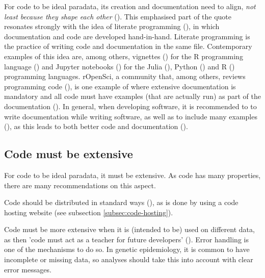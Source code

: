 For code to be ideal paradata, 
its creation and documentation need to align, 
\emph{not least because they shape each other} (\cite{huvila2022improving}).
This emphasised part of the quote resonates strongly with the idea of 
literate programming (\cite{knuth1984literate}),
in which documentation and code are developed hand-in-hand.
Literate programming is the practice of writing code and 
documentation in the same file.
Contemporary examples of this idea are, among others, 
vignettes (\cite{wickham2015r}) for the R programming language (\cite{r}) 
and Jupyter notebooks (\cite{wang2020assessing})
for the Julia (\cite{Julia-2017}), Python (\cite{van1995python}) and R (\cite{r})
programming languages.
rOpenSci, a community that, among others, reviews programming
code (\cite{ram2013ropensci,ram2018community}), is 
one example of where extensive documentation is mandatory
and all code must have examples (that are actually run)
as part of the documentation (\cite{ropensci_2021_6619350}).
In general, when developing software, 
it is recommended to 
to write documentation while writing software,
as well as to include many examples (\cite{lee2018ten}),
as this leads to both better code and documentation (\cite{reenskaug1989environment}).

\subsection{Code must be extensive}

For code to be ideal paradata, it must be extensive.
As code has many properties, there are many recommendations on this aspect.


Code should be distributed in standard ways (\cite{peng2006reproducible}),
as is done by using a code hosting website
(see subsection \ref{subsec:code-hosting}).


Code must be more extensive when it is (intended to be) 
used on different data,
as then 'code must act as a teacher for future developers' (\cite{sadowski2018modern}).
Error handling is one of the mechanisms to do so.
In genetic epidemiology, it is common to have incomplete or missing data,
so analyses should take this into account with clear error messages.

